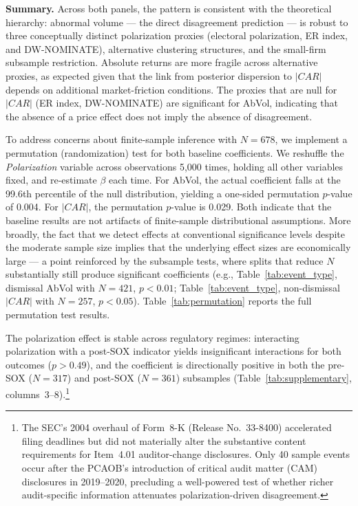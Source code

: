 \documentclass[12pt]{article}
\begin{document}
\textbf{Summary.} Across both panels, the pattern is consistent with the
theoretical hierarchy: abnormal volume --- the direct disagreement
prediction --- is robust to three conceptually distinct polarization
proxies (electoral polarization, ER index, and DW-NOMINATE), alternative
clustering structures, and the small-firm subsample restriction. Absolute
returns are more fragile across alternative proxies, as expected given that
the link from posterior dispersion to $|CAR|$ depends on additional
market-friction conditions. The proxies that are null for $|CAR|$ (ER
index, DW-NOMINATE) are significant for AbVol, indicating that the absence
of a price effect does not imply the absence of disagreement.

To address concerns about finite-sample inference with $N = 678$, we implement
a permutation (randomization) test for both baseline coefficients. We reshuffle
the \textit{Polarization} variable across observations 5,000 times, holding
all other variables fixed, and re-estimate $\beta$ each time. For AbVol, the
actual coefficient falls at the 99.6th percentile of the null distribution,
yielding a one-sided permutation $p$-value of 0.004. For $|CAR|$, the
permutation $p$-value is 0.029. Both indicate that the baseline results are
not artifacts of finite-sample distributional assumptions.
More broadly, the fact that we detect effects at conventional significance
levels despite the moderate sample size implies that the underlying effect
sizes are economically large --- a point reinforced by the subsample tests,
where splits that reduce $N$ substantially still produce significant
coefficients (e.g., Table~\ref{tab:event_type}, dismissal AbVol with
$N = 421$, $p < 0.01$; Table~\ref{tab:event_type}, non-dismissal $|CAR|$
with $N = 257$, $p < 0.05$).
Table~\ref{tab:permutation} reports the full permutation test results.

The polarization effect is stable across regulatory regimes: interacting
polarization with a post-SOX indicator yields insignificant interactions
for both outcomes ($p > 0.49$), and the coefficient is directionally
positive in both the pre-SOX ($N = 317$) and post-SOX ($N = 361$)
subsamples (Table~\ref{tab:supplementary}, columns~3--8).\footnote{The
SEC's 2004 overhaul of Form~8-K (Release No.~33-8400) accelerated filing
deadlines but did not materially alter the substantive content
requirements for Item~4.01 auditor-change disclosures. Only 40 sample
events occur after the PCAOB's introduction of critical audit matter
(CAM) disclosures in 2019--2020, precluding a well-powered test of
whether richer audit-specific information attenuates
polarization-driven disagreement.}
\end{document}
